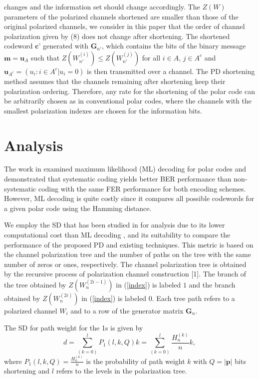 \documentclass[10pt,twocolumn]{IEEEtran}
\begin{document}
changes and the information set should change accordingly. The
$Z(W)$ parameters of the polarized channels shortened are smaller
than those of the original polarized channels, we consider in this
paper that the order of channel polarization given by (8) does not
change after shortening. The shortened codeword $\textbf{c'}$
generated with $\textbf{G}_{n'}$, which contains the bits of the
binary message $\textbf{m}=\textbf{u}_A$ such that $Z(W_{n'}^{(i)})
\leq Z(W_{n'}^{(j)})$ for all $i \in A$, $j \in A^c$ and
$\textbf{u}_{A^c}=(u_i:i \in A^c|u_i=0)$ is then transmitted over a
channel. The PD shortening method assumes that the channels
remaining after shortening keep their polarization ordering.
Therefore, any rate for the shortening of the polar code can be
arbitrarily chosen as in conventional polar codes, where the
channels with the smallest polarization indexes are chosen for the
information bits.

\section{Analysis}

The work in \cite{Liu} examined maximum likelihood (ML) decoding for
polar codes and demonstrated that systematic coding yields better
BER performance than non-systematic coding with the same FER
performance for both encoding schemes. However, ML decoding is quite
costly since it compares all possible codewords for a given polar
code using the Hamming distance.

We employ the SD that has been studied in \cite{Niu} for analysis
due to its lower computational cost than ML decoding \cite{Liu}, and
its suitability to compare the performance of the proposed PD and
existing techniques. This metric is based on the channel
polarization tree and the number of paths on the tree with the same
number of zeros or ones, respectively. The channel polarization tree
is obtained by the recursive process of polarization channel
construction [1]. The branch of the tree obtained by
$Z(W^{(2i-1)}_n)$ in (\ref{index}) is labeled $1$ and the branch
obtained by $Z(W^{(2i)}_n)$ in (\ref{index}) is labeled $0$. Each
tree path refers to a polarized channel $W_i$ and to a row of the
generator matrix $\textbf{G}_n$.

The SD for path weight for the 1s is given by \cite{Niu}
\begin{equation}
d = \sum_{(k = 0)}^lP_1(l,k,Q)k = \sum_{(k = 0)}^l\frac{H_n^{(k)}}{n}k,
\end{equation}
where $P_1(l,k,Q)=\frac{H_n^{(k)}}{n}$ is the probability of path
weight $k$ with $Q=|\textbf{p}|$ bits shortening and $l$ refers to
the levels in the polarization tree.
\end{document}
